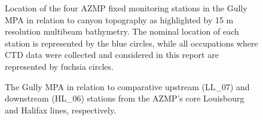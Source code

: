 \documentclass[12pt]{article}\usepackage[]{graphicx}\usepackage[]{color}
\begin{document}
\begin{figure}[htb]

{\centering {} 

}

\caption{Location of the four AZMP fixed monitoring stations in the Gully MPA in relation to canyon topography as highlighted by 15 m resolution multibeam bathymetry. The nominal location of each station is represented by the blue circles, while all occupations where CTD data were collected and considered in this report are represented by fuchsia circles.}\label{fig:figure2}
\end{figure}
\clearpage


\begin{landscapepage}
\begin{figure}[htb]

{\centering {} 

}

\caption{The Gully MPA in relation to comparative upstream (LL\_07) and downstream (HL\_06) stations from the AZMP's core Louisbourg and Halifax lines, respectively.}\label{fig:figure3}
\end{figure}
\end{landscapepage}
\clearpage
\end{document}
